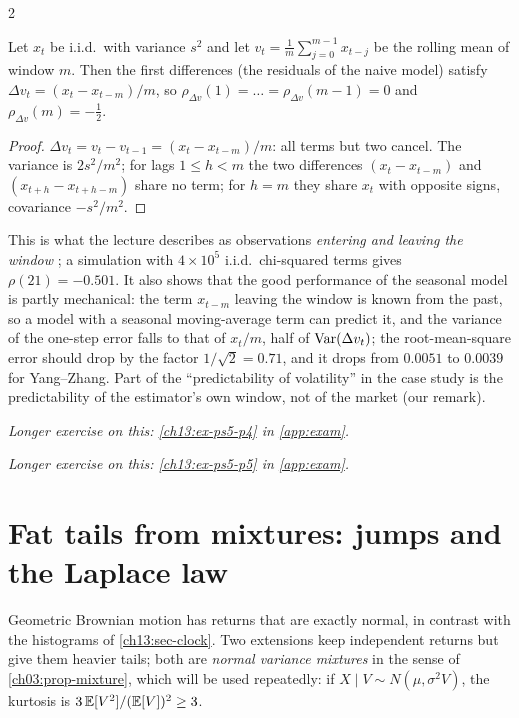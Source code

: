 \begin{paracol}{2}
\begin{secondary}
\begin{proposition}\label{ch13:prop-lag21}
Let $x_t$ be i.i.d.\ with variance $s^2$ and let $v_t=\frac1m\sum_{j=0}^{m-1}x_{t-j}$ be the rolling mean of window $m$. Then the first differences (the
residuals of the naive model) satisfy $\Delta v_t=(x_t-x_{t-m})/m$, so
$\rho_{\Delta v}(1)=\dots=\rho_{\Delta v}(m-1)=0$ and $\rho_{\Delta v}(m)=-\tfrac12$.
\end{proposition}
\begin{proof}
$\Delta v_t=v_t-v_{t-1}=(x_t-x_{t-m})/m$: all terms but two cancel. The variance is $2s^2/m^2$; for lags $1\le h<m$ the two
differences $(x_t-x_{t-m})$ and $(x_{t+h}-x_{t+h-m})$ share no term; for $h=m$ they share $x_t$ with opposite signs, covariance $-s^2/m^2$.
\end{proof}
This is what the lecture describes as observations \emph{entering and leaving the window} ; a simulation with $4\times10^5$
i.i.d.\ chi-squared terms gives $\rho(21)=-0.501$. It also shows that the good performance of the seasonal model is partly mechanical: the term $x_{t-m}$ leaving the window is known
from the past, so a model with a seasonal moving-average term can predict it, and the variance of the one-step error falls to that of $x_t/m$,
half of $\operatorname{Var}(\Delta v_t)$; the root-mean-square error should drop by the factor $1/\sqrt2=0.71$, and it drops from $0.0051$ to $0.0039$ for Yang--Zhang. Part of the
``predictability of volatility'' in the case study is the predictability of the estimator's own window, not of the market (our remark).
\end{secondary}

\noindent\emph{Longer exercise on this: \cref{ch13:ex-ps5-p4} in \cref{app:exam}.}

\noindent\emph{Longer exercise on this: \cref{ch13:ex-ps5-p5} in \cref{app:exam}.}


\section{Fat tails from mixtures: jumps and the Laplace law}\label{ch13:sec-mix}
Geometric Brownian motion has returns that are exactly normal, in contrast with the histograms of \cref{ch13:sec-clock}.
Two extensions keep independent returns but give them heavier tails; both are \emph{normal variance mixtures} in the sense of
\cref{ch03:prop-mixture}, which will be used repeatedly: if $X\mid V\sim N(\mu,\sigma^2V)$, the kurtosis is $3\,\mathbb{E}[V^2]/(\mathbb{E}[V])^2\ge3$.


\end{paracol}
